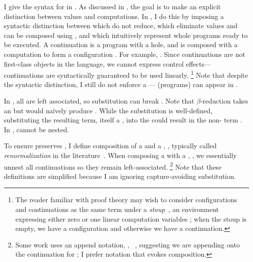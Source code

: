 I give the syntax for \tlang in .
As discussed in , the goal is to make an explicit
distinction between values and computations.
In \tlang, I do this by imposing a syntactic distinction between
 \im{\tV} which do not reduce,
 \im{\tN} which
eliminate values and can be composed
using  \im{\tK}, and
 \im{\tM} which
intuitively represent whole programs ready to be executed.
A continuation \im{\tK} is a program with a hole, and is composed
\im{\tK\hw{\tN}} with a computation \im{\tN} to form a configuration \im{\tM}.
For example, \im{(\tlete{\tx}{\hole}{\tsnde{\tx}})\hw{\tN} =
  \tlete{\tx}{\tN}{\tsnde{\tx}}}.
Since continuations are not first-class objects in the language, we cannot
express control effects---continuations are syntactically guaranteed to be used
linearly.
%
\footnote{The reader familiar with proof theory
  may wish to consider configurations and continuations as the same term under a
  \emph{stoup}~\cite{girard1991}, an environment expressing either zero or one
  linear computation variables \im{\hole}; when the stoup is empty, we have a
  configuration and otherwise we have a continuation.}
%
Note that despite the syntactic distinction, I still do not enforce a
--- (programs) can
appear in .

\FigECCAHetero
In , all  are left associated, so substitution can
break .
Note that \(\beta\)-reduction takes an  
\im{\tK\hw{\tappe{(\tfune{\tx}{\tA}{\tM})}{\tV}}} but would na\"ively produce
\im{\tK\hw{\subst{\tM}{\tV}{\tx}}}.
While the substitution \im{\subst{\tM}{\tV}{\tx}} is well-defined, substituting
the resulting term, itself a \emph{}, into the
 \im{\tK} could result in the non- term
\im{\tlete{\tx}{\tM}{\tMpr}}.
In ,  cannot be nested.


To ensure  preserves , I define composition of a
 \im{\tK} and a  \im{\tM},
, typically called \emph{renormalization} in the
literature~\cite{sabry1997:on-cbv,kennedy2007}.
When composing a  with a ,
\im{\tK\hhw{\tM}}, we essentially unnest all continuations so they remain
left-associated.%
\footnote{
  Some work uses an append notation, \eg, \im{\tM ::
    \tK}~\cite{sabry1997:on-cbv}, suggesting we are appending \im{\tK} onto the
  continuation for \im{\tM}; I prefer notation that evokes composition.
}
Note that these definitions are simplified because I am ignoring
capture-avoiding substitution.

